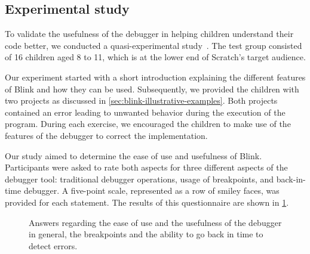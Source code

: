 \documentclass[../main]{subfiles}
\begin{document}
\subsection{Experimental study}\label{subsec:blink-experimental-study}
To validate the usefulness of the debugger in helping children understand their code better, we conducted a quasi-experimental study~\autocite{shadishExperimentalQuasiexperimentalDesigns2002a}.
The test group consisted of 16 children aged 8 to 11, which is at the lower end of Scratch's target audience.

Our experiment started with a short introduction explaining the different features of Blink and how they can be used.
Subsequently, we provided the children with two projects as discussed in \cref{sec:blink-illustrative-examples}.
Both projects contained an error leading to unwanted behavior during the execution of the program.
During each exercise, we encouraged the children to make use of the features of the debugger to correct the implementation.

Our study aimed to determine the ease of use and usefulness of Blink.
Participants were asked to rate both aspects for three different aspects of the debugger tool: traditional debugger operations, usage of breakpoints, and back-in-time debugger.
A five-point scale, represented as a row of smiley faces, was provided for each statement.
The results of this questionnaire are shown in \cref{fig:blink-results}.

\begin{figure}
    \centering
    
    \caption{
        Answers regarding the ease of use and the usefulness of the debugger in general,
        the breakpoints and the ability to go back in time to detect errors.
    }
    \label{fig:blink-results}
\end{figure}
\end{document}
